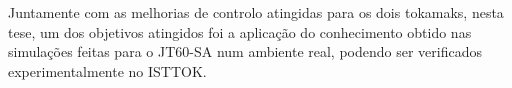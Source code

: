 Juntamente com as melhorias de controlo atingidas para os dois tokamaks, nesta tese, um dos objetivos atingidos foi a aplicação do conhecimento obtido nas simulações feitas para o JT60-SA num ambiente real, podendo ser verificados experimentalmente no ISTTOK.



\vfill

